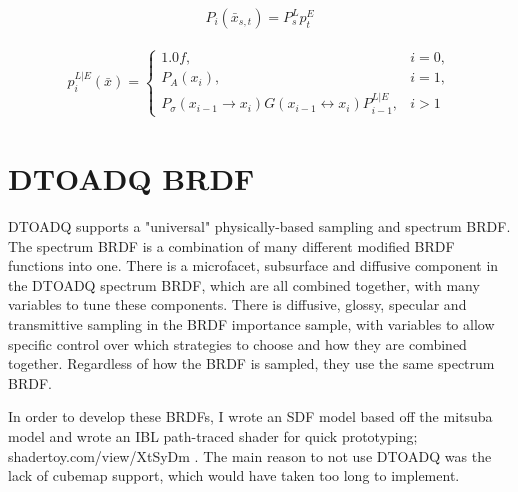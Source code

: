 \documentclass{article}
\begin{document}
  \begin{align}
    P_i(\bar{x}_{s, t}) = P^L_s p^E_t
  \end{align}

  \begin{align}
    p^{L|E}_i(\bar{x}) =
    \begin{cases}
      1.0f, & i = 0,\\
      P_A(x_i), & i = 1,\\
      P_{\sigma}(x_{i-1} \rightarrow x_i) G(x_{i-1} \leftrightarrow x_i)
      P^{L|E}_{i-1}, & i > 1
    \end{cases}
  \end{align}


  \section{DTOADQ BRDF}
  DTOADQ supports a "universal" physically-based sampling and spectrum BRDF. The
spectrum BRDF is a combination of many different modified BRDF functions into
one. There is a microfacet, subsurface and diffusive component in the DTOADQ
spectrum BRDF, which are all combined together, with many variables to tune
these components. There is diffusive, glossy, specular and transmittive sampling
in the BRDF importance sample, with variables to allow specific control over
which strategies to choose and how they are combined together. Regardless of how
the BRDF is sampled, they use the same spectrum BRDF.
  
  In order to develop these BRDFs, I wrote an SDF model based off the mitsuba
model and wrote an IBL path-traced shader for quick prototyping;
shadertoy.com/view/XtSyDm . The main reason to not use DTOADQ was the lack of
cubemap support, which would have taken too long to implement.
  
\end{document}
